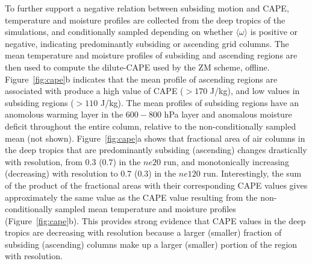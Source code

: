 To further support a negative relation between subsiding motion and CAPE, temperature and moisture profiles are collected from the deep tropics of the simulations, and conditionally sampled depending on whether $\langle \omega \rangle$ is positive or negative, indicating predominantly subsiding or ascending grid columns. The mean temperature and moisture profiles of subsiding and ascending regions are then used to compute the dilute-CAPE used by the ZM scheme, offline. Figure~\ref{fig:cape}b indicates that the mean profile of ascending regions are associated with produce a high value of CAPE ($>170$ J/kg), and low values in subsiding regions ($>110$ J/kg). The mean profiles of subsiding regions have an anomolous warming layer in the $600-800$ hPa layer and anomalous moisture deficit throughout the entire column, relative to the non-conditionally sampled mean (not shown). Figure~\ref{fig:cape}a shows that fractional area of air columns in the deep tropics that are predominantly subsiding (ascending) changes drastically with resolution, from $0.3$ ($0.7$) in the $ne20$ run, and monotonically increasing (decreasing) with resolution to $0.7$ ($0.3$) in the $ne120$ run. Interestingly, the sum of the product of the fractional areas with their corresponding CAPE values gives approximately the same value as the CAPE value resulting from the non-conditionally sampled mean temperature and moisture profiles (Figure~\ref{fig:cape}b). This provides strong evidence that CAPE values in the deep tropics are decreasing with resolution because a larger (smaller) fraction of subsiding (ascending) columns make up a larger (smaller) portion of the region with resolution.

